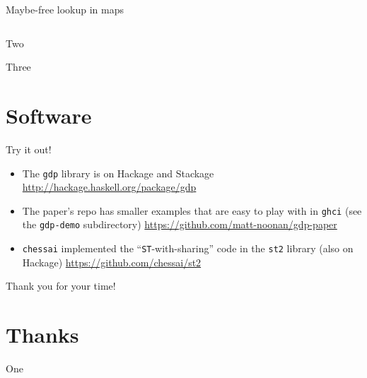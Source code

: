 \documentclass{beamer}
\begin{document}
\begin{frame}{Maybe-free lookup in maps}
  \inputminted{haskell}{jmap.hs}
\end{frame}

\begin{frame}{Two}

\end{frame}

\begin{frame}{Three}

\end{frame}

  \section{Software}   %

\begin{frame}{Try it out!}
  \begin{itemize}
  \item{The \texttt{gdp} library is on Hackage and Stackage
    \url{http://hackage.haskell.org/package/gdp}\medskip
  }
  \item{The paper's repo has smaller examples that are easy to play with
    in \texttt{ghci} (see the \texttt{gdp-demo} subdirectory)
    \url{https://github.com/matt-noonan/gdp-paper}\medskip}
  \item{\texttt{chessai} implemented the ``\texttt{ST}-with-sharing'' code
    in the \texttt{st2} library (also on Hackage) \url{https://github.com/chessai/st2}}
  \end{itemize}
  \medskip
  \Large{Thank you for your time!}
\end{frame}

  \section{Thanks}   %

\begin{frame}{One}

\end{frame}
\end{document}

